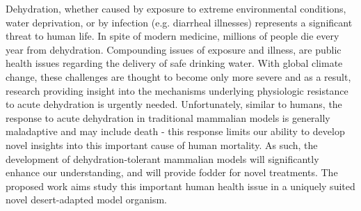 \documentclass[11pt]{article}
\begin{document}
Dehydration, whether caused by exposure to extreme environmental conditions, water deprivation, or by infection (e.g. diarrheal illnesses) represents a significant threat to human life. In spite of modern medicine, millions of people die every year from dehydration. Compounding issues of exposure and illness, are public health issues regarding the delivery of safe drinking water. With global climate change, these challenges are thought to become only more severe and as a result, research providing insight into the mechanisms underlying physiologic resistance to acute dehydration is urgently needed. Unfortunately, similar to humans, the response to acute dehydration in traditional mammalian models is generally maladaptive and may include death - this response limits our ability to develop novel insights into this important cause of human mortality. As such, the development of dehydration-tolerant mammalian models will significantly enhance our understanding, and will provide fodder for novel treatments. The proposed work aims study this important human health issue in a uniquely suited novel desert-adapted model organism.
\end{document}
